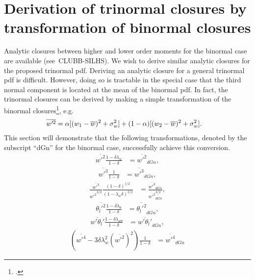 \section{Derivation of trinormal closures by transformation of binormal closures}
\label{sec:transformationequations}

Analytic closures between higher and lower order moments for the binormal case
are available (see~CLUBB-SILHS\autocite{larson2022clubbsilhs}).
We wish to derive similar analytic closures for the proposed trinormal \gls{pdf}.
Deriving an analytic closure for a general trinormal \gls{pdf} is difficult.
However, doing so is tractable in the special case that the third normal component
is located at the mean of the binormal \gls{pdf}.
In fact, the trinormal closures can be derived
by making a simple transformation of the binormal closures\footcite{larson2005using},
e.g.
\begin{align}
    \label{eq:wp2_bar_dGn}
    \overline{w'^2}
    &= \alpha [(w_1 - \overline{w})^2 + \sigma_w^2]
    + (1 - \alpha) [(w_2 - \overline{w})^2 + \sigma_w^2].
\end{align}
This section will demonstrate that the following transformations,
denoted by the subscript \enquote{dGn} for the binormal case,
successfully achieve this conversion.
\begin{align}
    \label{eq:w_prime_2_transform}
    \overline{w'^2} \frac{1 - \delta\lambda_w}{1 - \delta}
    &= \overline{w'^2}_{dGn},
\end{align}
\begin{align}
    \label{eq:w_prime_3_transform}
    \overline{w'^3} \frac{1}{1 - \delta}
    &= \overline{w'^3}_{dGn},
\end{align}
\begin{align}
    \label{eq:w_prime_3_div_w_prime_2_transform}
    \frac{\overline{w'^3}}{\overline{w'^2}^{3/2}} \frac{(1 - \delta)^{1/2}}{(1 - \lambda_w\delta)^{3/2}}
    &= \frac{\overline{w'^3}_{dGn}}{\overline{w'^2}_{dGn}^{3/2}},
\end{align}
\begin{align}
    \label{eq:theta_l_prime_transform}
    \overline{\theta_l'^2} \frac{1 - \delta\lambda_\theta}{1 - \delta}
    &= \overline{\theta_l'^2}_{dGn},
\end{align}
\begin{align}
    \label{eq:w_prime_theta_l_prime_transform}
    \overline{w'\theta_l'} \frac{1 - \delta\lambda_{w\theta}}{1 - \delta}
    &= \overline{w'\theta_l'}_{dGn},
\end{align}
\begin{align}
    \label{eq:w_prime_4_transform}
    \left(\overline{w'^4} - 3\delta\lambda_w^2 \left(\overline{w'^2}\right)^2\right) \frac{1}{1 - \delta}
    &= \overline{w'^4}_{dGn}
\end{align}
